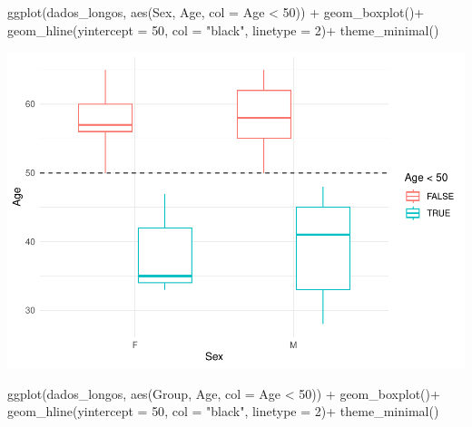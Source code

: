 \documentclass[
]{article}
\newenvironment{Shaded}{\begin{snugshade}}{\end{snugshade}}
\newcommand{\AttributeTok}[1]{\textcolor[rgb]{0.80,0.80,0.80}{#1}}
\newcommand{\DecValTok}[1]{\textcolor[rgb]{0.86,0.86,0.80}{#1}}
\newcommand{\FunctionTok}[1]{\textcolor[rgb]{0.94,0.94,0.56}{#1}}
\newcommand{\NormalTok}[1]{\textcolor[rgb]{0.80,0.80,0.80}{#1}}
\newcommand{\SpecialCharTok}[1]{\textcolor[rgb]{0.86,0.64,0.64}{#1}}
\newcommand{\StringTok}[1]{\textcolor[rgb]{0.80,0.58,0.58}{#1}}
\begin{document}
\begin{Shaded}
\begin{Highlighting}[]
\FunctionTok{ggplot}\NormalTok{(dados\_longos, }\FunctionTok{aes}\NormalTok{(Sex, Age, }\AttributeTok{col =}\NormalTok{ Age }\SpecialCharTok{\textless{}} \DecValTok{50}\NormalTok{)) }\SpecialCharTok{+} 
  \FunctionTok{geom\_boxplot}\NormalTok{()}\SpecialCharTok{+}
  \FunctionTok{geom\_hline}\NormalTok{(}\AttributeTok{yintercept =} \DecValTok{50}\NormalTok{, }\AttributeTok{col =} \StringTok{"black"}\NormalTok{, }\AttributeTok{linetype =} \DecValTok{2}\NormalTok{)}\SpecialCharTok{+}
  \FunctionTok{theme\_minimal}\NormalTok{()}
\end{Highlighting}
\end{Shaded}

\includegraphics{EDA__files/figure-latex/unnamed-chunk-5-1.pdf}

\begin{Shaded}
\begin{Highlighting}[]
\FunctionTok{ggplot}\NormalTok{(dados\_longos, }\FunctionTok{aes}\NormalTok{(Group, Age, }\AttributeTok{col =}\NormalTok{ Age }\SpecialCharTok{\textless{}} \DecValTok{50}\NormalTok{)) }\SpecialCharTok{+} 
  \FunctionTok{geom\_boxplot}\NormalTok{()}\SpecialCharTok{+}
  \FunctionTok{geom\_hline}\NormalTok{(}\AttributeTok{yintercept =} \DecValTok{50}\NormalTok{, }\AttributeTok{col =} \StringTok{"black"}\NormalTok{, }\AttributeTok{linetype =} \DecValTok{2}\NormalTok{)}\SpecialCharTok{+}
  \FunctionTok{theme\_minimal}\NormalTok{()}
\end{Highlighting}
\end{Shaded}
\end{document}
